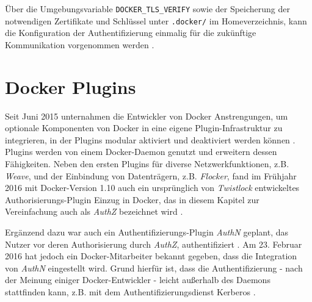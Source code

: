 \documentclass[../main.tex]{subfiles}
\begin{document}
    Über die Umgebungsvariable \texttt{DOCKER\_TLS\_VERIFY} sowie der Speicherung der notwendigen Zertifikate und Schlüssel unter \texttt{.docker/} im Homeverzeichnis, kann die Konfiguration der Authentifizierung einmalig für die zukünftige Kommunikation vorgenommen werden \cite{dockerSecurityHTTPS}.




  \section{Docker Plugins}
  \label{plugins}
    Seit Juni 2015 unternahmen die Entwickler von Docker Anstrengungen, um optionale Komponenten von Docker in eine eigene Plugin-Infrastruktur zu integrieren, in der Plugins modular aktiviert und deaktiviert werden können \cite{githubDockerChangelog}\cite{dockerPlugins}. Plugins werden von einem Docker-Daemon genutzt und erweitern dessen Fähigkeiten. Neben den ersten Plugins für diverse Netzwerkfunktionen, z.B. \emph{Weave}, und der Einbindung von Datenträgern, z.B. \emph{Flocker}, fand im Frühjahr 2016 mit Docker-Version 1.10 auch ein ursprünglich von \emph{Twistlock}\cite{twistlock} entwickeltes Authorisierungs-Plugin Einzug in Docker, das in diesem Kapitel zur Vereinfachung auch als \emph{AuthZ} bezeichnet wird \cite{githubPluginList}\cite{dockerPlugins}\cite{authzTwistlock}.

    Ergänzend dazu war auch ein Authentifizierungs-Plugin \emph{AuthN} geplant, das Nutzer vor deren Authorisierung durch \emph{AuthZ}, authentifiziert \cite{githubAuthZDockerAccessControl}. Am 23. Februar 2016 hat jedoch ein Docker-Mitarbeiter bekannt gegeben, dass die Integration von \emph{AuthN} eingestellt wird. Grund hierfür ist, dass die Authentifizierung - nach der Meinung einiger Docker-Entwickler - leicht außerhalb des Daemons stattfinden kann, z.B. mit dem Authentifizierungsdienst Kerberos\cite{kerberos} \cite{githubAuthZKerberosSupport}\cite{githubAuthNLaydown}.
\end{document}
